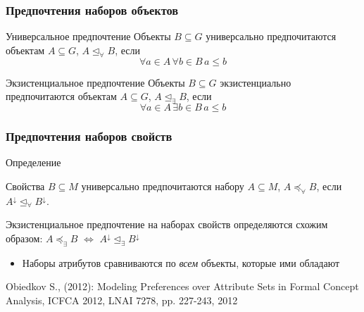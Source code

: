 \documentclass{beamer}
\newcommand{\eng}[1]{\foreignlanguage{english}{#1}}
\newcommand{\obj}[1]{\left\{ #1 \right \}}
\newcommand{\brac}[1]{\left ( #1 \right )}
\begin{document}
\begin{frame}\frametitle{Предпочтения наборов объектов}
  \begin{block}{Универсальное предпочтение}
    Объекты $B\subseteq G$ универсально предпочитаются объектам $A\subseteq G$, $A\trianglelefteq_\forall B$, если\[ \forall a\in A\, \forall b\in B\, a\leq b\]
  \end{block}
  \begin{block}{Экзистенциальное предпочтение}
    Объекты $B\subseteq G$ экзистенциально предпочитаются объектам $A\subseteq G$, $A\trianglelefteq_\exists B$, если\[ \forall a\in A\, \exists b\in B\, a\leq b\]
  \end{block}
\end{frame}

\begin{frame}\frametitle{Предпочтения наборов свойств}
  \begin{block}{Определение}

    Свойства $B\subseteq M$ универсально предпочитаются набору $A\subseteq M$, $A\preceq_\forall B$, если $A^\downarrow \trianglelefteq_\forall B^\downarrow$.

    Экзистенциальное предпочтение на наборах свойств определяются схожим образом: $A\preceq_\exists B$ $\Leftrightarrow$ $A^\downarrow \trianglelefteq_\exists B^\downarrow$
  \end{block}

  \begin{itemize}
    \item Наборы атрибутов сравниваются по \emph{всем} объекты, которые ими обладают
  \end{itemize}

  \eng{Obiedkov S., (2012): Modeling Preferences over Attribute Sets in Formal Concept Analysis, ICFCA 2012, LNAI 7278, pp. 227-243, 2012}
\end{frame}

\end{document}
